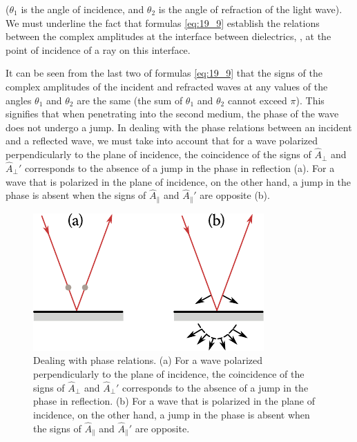 \noindent
($\theta_1$ is the angle of incidence, and $\theta_2$ is the angle of refraction of the light wave).
We must underline the fact that formulas \eqref{eq:19_9} establish the relations between the complex amplitudes at the interface between dielectrics, \ie, at the point of incidence of a ray on this interface.

It can be seen from the last two of formulas \eqref{eq:19_9} that the signs of the complex amplitudes of the incident and refracted waves at any values of the angles $\theta_1$ and $\theta_2$ are the same (the sum of $\theta_1$ and $\theta_2$ cannot exceed $\pi$).
This signifies that when penetrating into the second medium, the phase of the wave does not undergo a jump.
In dealing with the phase relations between an incident and a reflected wave, we must take into account that for a wave polarized perpendicularly to the plane of incidence, the coincidence of the
signs of $\hat{A}_{\perp}$ and $\hat{A}_{\perp}'$ corresponds to the absence of a jump in the phase in reflection (a).
For a wave that is polarized in the plane of incidence, on the other hand, a jump in the phase is absent when the signs of $\hat{A}_{\parallel}$ and $\hat{A}_{\parallel}'$ are opposite (b).

\begin{figure}[t]
	\begin{center}
		\includegraphics[scale=1]{figures/ch_19/fig_19_7.pdf}
        \caption[]{Dealing with phase relations. (a) For a wave polarized perpendicularly to the plane of incidence, the coincidence of the signs of $\hat{A}_{\perp}$ and $\hat{A}_{\perp}'$ corresponds to the absence of a jump in the phase in reflection. (b) For a wave that is polarized in the plane of incidence, on the other hand, a jump in the phase is absent when the signs of $\hat{A}_{\parallel}$ and $\hat{A}_{\parallel}'$ are opposite.}
		\label{fig:19_7}
	\end{center}
	\vspace{-0.8cm}
\end{figure}


